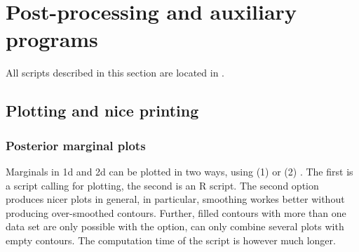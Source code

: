 \documentclass[11pt, chapterprefix, headsepline]{scrartcl}
\begin{document}
\section{Post-processing and auxiliary programs}

All scripts described in this section are located in .


\subsection{Plotting and nice printing}

\subsubsection{Posterior marginal plots}
\label{sec:marginal_plots}

Marginals in 1d and 2d can be plotted in two ways, using (1)
 or (2) .  The first
is a  script calling  for plotting, the
second is an R script. The second option produces nicer plots in
general, in particular, smoothing workes better without producing
over-smoothed contours. Further, filled contours with more than one
data set are only possible with the  option, 
can only combine several plots with empty contours. The computation
time of the  script is however much longer.
\end{document}
